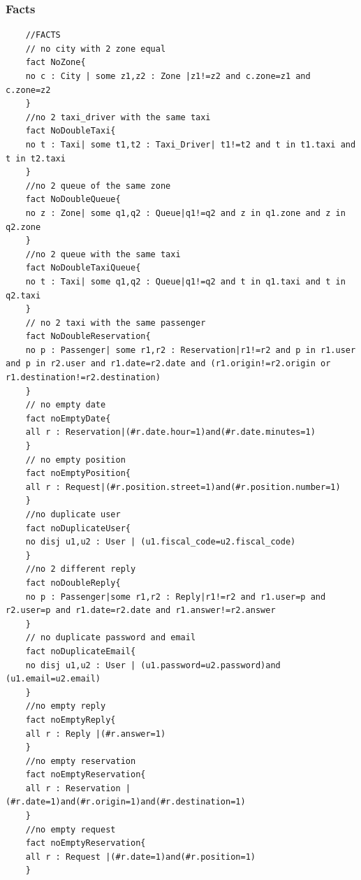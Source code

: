 \documentclass[11pt, a4paper,titlepage]{article}
\begin{document}
	\subsubsection{Facts}
	\begin{verbatim}
	//FACTS
	// no city with 2 zone equal
	fact NoZone{
	no c : City | some z1,z2 : Zone |z1!=z2 and c.zone=z1 and c.zone=z2
	}
	//no 2 taxi_driver with the same taxi
	fact NoDoubleTaxi{
	no t : Taxi| some t1,t2 : Taxi_Driver| t1!=t2 and t in t1.taxi and t in t2.taxi
	}
	//no 2 queue of the same zone
	fact NoDoubleQueue{
	no z : Zone| some q1,q2 : Queue|q1!=q2 and z in q1.zone and z in q2.zone
	}
	//no 2 queue with the same taxi
	fact NoDoubleTaxiQueue{
	no t : Taxi| some q1,q2 : Queue|q1!=q2 and t in q1.taxi and t in q2.taxi
	}
	// no 2 taxi with the same passenger
	fact NoDoubleReservation{
	no p : Passenger| some r1,r2 : Reservation|r1!=r2 and p in r1.user and p in r2.user and r1.date=r2.date and (r1.origin!=r2.origin or r1.destination!=r2.destination)
	}
	// no empty date
	fact noEmptyDate{
	all r : Reservation|(#r.date.hour=1)and(#r.date.minutes=1)
	}
	// no empty position
	fact noEmptyPosition{
	all r : Request|(#r.position.street=1)and(#r.position.number=1)
	}
	//no duplicate user
	fact noDuplicateUser{
	no disj u1,u2 : User | (u1.fiscal_code=u2.fiscal_code)
	}
	//no 2 different reply
	fact noDoubleReply{
	no p : Passenger|some r1,r2 : Reply|r1!=r2 and r1.user=p and r2.user=p and r1.date=r2.date and r1.answer!=r2.answer
	}
	// no duplicate password and email
	fact noDuplicateEmail{
	no disj u1,u2 : User | (u1.password=u2.password)and (u1.email=u2.email)
	}
	//no empty reply
	fact noEmptyReply{
	all r : Reply |(#r.answer=1)
	}
	//no empty reservation
	fact noEmptyReservation{
	all r : Reservation |(#r.date=1)and(#r.origin=1)and(#r.destination=1)
	}
	//no empty request
	fact noEmptyReservation{
	all r : Request |(#r.date=1)and(#r.position=1)
	}
		\end{verbatim}
\end{document}
